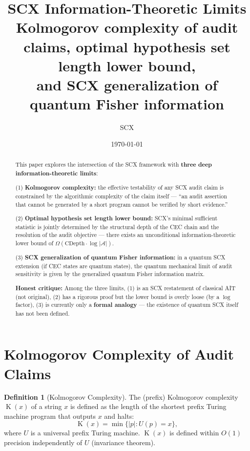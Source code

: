 \documentclass[12pt,a4paper]{article}
\title{\textbf{SCX Information-Theoretic Limits}\\[0.3em]
       \large Kolmogorov complexity of audit claims, optimal hypothesis set length lower bound, \\ and SCX generalization of quantum Fisher information}
\author{SCX}
\date{\today}
\theoremstyle{plain}
\theoremstyle{definition}
\newtheorem{definition}[theorem]{Definition}
\DeclareMathOperator{\Kolm}{K}
\begin{document}
\maketitle

\begin{abstract}
This paper explores the intersection of the SCX framework with \textbf{three deep information-theoretic limits}:

(1) \textbf{Kolmogorov complexity:} the effective testability of any SCX audit claim is constrained by the algorithmic complexity of the claim itself ---
``an audit assertion that cannot be generated by a short program cannot be verified by short evidence.''

(2) \textbf{Optimal hypothesis set length lower bound:} SCX's minimal sufficient statistic is jointly determined by the structural depth of the CEC chain and
the resolution of the audit objective --- there exists an unconditional information-theoretic lower bound of $\Omega(\text{CDepth} \cdot \log|\mathcal{A}|)$.

(3) \textbf{SCX generalization of quantum Fisher information:} in a quantum SCX extension (if CEC states are quantum states),
the quantum mechanical limit of audit sensitivity is given by the generalized quantum Fisher information matrix.

\textbf{Honest critique:} Among the three limits, (1) is an SCX restatement of classical AIT (not original),
(2) has a rigorous proof but the lower bound is overly loose (by a $\log$ factor),
(3) is currently only a \textbf{formal analogy} --- the existence of quantum SCX itself has not been defined.
\end{abstract}

\tableofcontents

\section{Kolmogorov Complexity of Audit Claims}
\label{sec:kolmogorov}

\begin{definition}[Kolmogorov Complexity]
\label{def:kolmogorov}
The (prefix) Kolmogorov complexity $\Kolm(x)$ of a string $x$ is defined as the length of the shortest prefix Turing machine program that outputs $x$ and halts:
\begin{equation}
\Kolm(x) = \min\{|p| : U(p) = x\},
\end{equation}
where $U$ is a universal prefix Turing machine. $\Kolm(x)$ is defined within $O(1)$ precision independently of $U$ (invariance theorem).
\end{definition}
\end{document}
